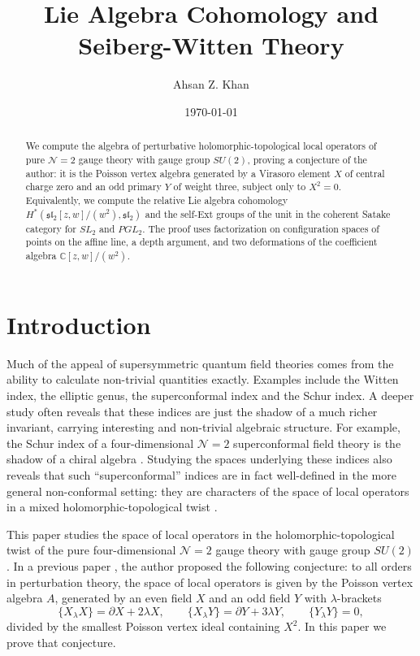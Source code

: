 \documentclass[11pt]{amsart}
\title{Lie Algebra Cohomology and Seiberg-Witten Theory}
\author{Ahsan Z. Khan}
\date{\today}
\numberwithin{equation}{section}
\theoremstyle{definition}
\theoremstyle{remark}
\newcommand{\dd}{\partial}
\begin{document}
\begin{abstract}
We compute the algebra of perturbative holomorphic-topological local operators of pure $\mathcal N=2$ gauge theory with gauge group $SU(2)$, proving a conjecture of the author: it is the Poisson vertex algebra generated by a Virasoro element $X$ of central charge zero and an odd primary $Y$ of weight three, subject only to $X^2=0$. Equivalently, we compute the relative Lie algebra cohomology $H^*(\mathfrak{sl}_2[z,w]/(w^2),\mathfrak{sl}_2)$ and the self-Ext groups of the unit in the coherent Satake category for $SL_2$ and $PGL_2$. The proof uses factorization on configuration spaces of points on the affine line, a depth argument, and two deformations of the coefficient algebra $\mathbb C[z,w]/(w^2)$.
\end{abstract}

\maketitle

\section{Introduction}

Much of the appeal of supersymmetric quantum field theories comes from the ability to calculate non-trivial quantities exactly. Examples include the Witten index, the elliptic genus, the superconformal index and the Schur index. A deeper study often reveals that these indices are just the shadow of a much richer invariant, carrying interesting and non-trivial algebraic structure. For example, the Schur index of a four-dimensional $\mathcal N=2$ superconformal field theory is the shadow of a chiral algebra \cite{BLLPRR15}. Studying the spaces underlying these indices also reveals that such ``superconformal'' indices are in fact well-defined in the more general non-conformal setting: they are characters of the space of local operators in a mixed holomorphic-topological twist \cite{Kap06,Kha26}.

This paper studies the space of local operators in the holomorphic-topological twist of the pure four-dimensional $\mathcal{N}=2$ gauge theory with gauge group $SU(2)$ \cite{SW94}. In a previous paper \cite{Kha26}, the author proposed the following conjecture: to all orders in perturbation theory, the space of local operators is given by the Poisson vertex algebra $A$, generated by an even field $X$ and an odd field $Y$ with $\lambda$-brackets
\begin{equation}\label{eq:brackets}
\{X_\lambda X\}=\dd X+2\lambda X,\qquad
\{X_\lambda Y\}=\dd Y+3\lambda Y,\qquad
\{Y_\lambda Y\}=0,
\end{equation}
divided by the smallest Poisson vertex ideal containing $X^2$. In this paper we prove that conjecture.
\end{document}
